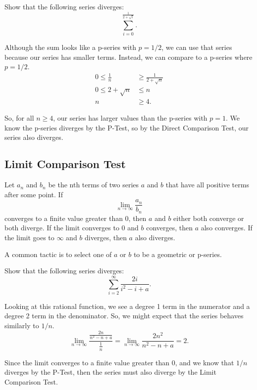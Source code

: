 \begin{example}
	Show that the following series diverges:
	\begin{equation*}
		\sum_{i=0}^{\frac{1}{2+\sqrt{i}}}.
	\end{equation*}
\end{example}
\begin{answer}
	Although the sum looks like a p-series with $p=1/2$, we can use that series because our series has smaller terms.
	Instead, we can compare to a p-series where $p=1/2$.
	\begin{align*}
		0 \leq \frac{1}{n} &\geq \frac{1}{2+\sqrt{n}} \\
		0 \leq 2 + \sqrt{n} &\leq n \\
		n & \geq 4.
	\end{align*}
	
	So, for all $n \geq 4$, our series has larger values than the p-series with $p=1$.
	We know the p-series diverges by the P-Test, so by the Direct Comparison Test, our series also diverges.
\end{answer}

\subsection{Limit Comparison Test}
\begin{lemma}
	Let $a_n$ and $b_n$ be the nth terms of two series $a$ and $b$ that have all positive terms after some point.
	If
	\begin{equation*}
		\lim_{n\to\infty}{\frac{a_n}{b_n}}
	\end{equation*}
	converges to a finite value greater than 0, then $a$ and $b$ either both converge or both diverge.
	If the limit converges to 0 and $b$ converges, then $a$ also converges.
	If the limit goes to $\infty$ and $b$ diverges, then $a$ also diverges.
\end{lemma}

A common tactic is to select one of $a$ or $b$ to be a geometric or p-series.

\begin{example}
	Show that the following series diverges:
	\begin{equation*}
		\sum_{i=2}^{\infty}{\frac{2i}{i^2-i+a}}.
	\end{equation*}
\end{example}
\begin{answer}
	Looking at this rational function, we see a degree 1 term in the numerator and a degree 2 term in the denominator.
	So, we might expect that the series behaves similarly to $1/n$.
	\begin{equation*}
		\lim_{n\to\infty}{\frac{\frac{2n}{n^2-n+a}}{\frac{1}{n}}} = \lim_{n\to\infty}{\frac{2n^2}{n^2-n+a}} = 2.
	\end{equation*}
	
	Since the limit converges to a finite value greater than 0, and we know that $1/n$ diverges by the P-Test, then the series must also diverge by the Limit Comparison Test.
\end{answer}

